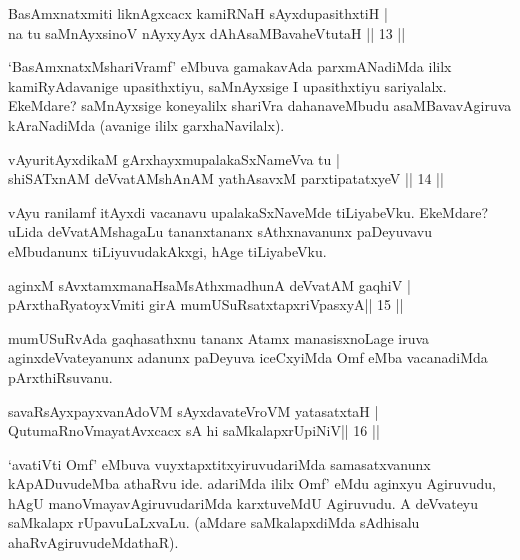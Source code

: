 \begin{shl}
BasAmxnatxmiti liknAgxcacx kamiRNaH sAyxdupasithxtiH  | \\
na tu saMnAyxsinoV nAyxyAyx dAhAsaMBavaheVtutaH \hfill||  13 || 
\end{shl}

\begin{artha} 
`BasAmxnatxMshariVramf' eMbuva gamakavAda parxmANadiMda ililx 
kamiRyAdavanige upasithxtiyu, saMnAyxsige I upasithxtiyu sariyalalx. 
EkeMdare? saMnAyxsige koneyalilx shariVra dahanaveMbudu 
asaMBavavAgiruva kAraNadiMda (avanige ililx garxhaNavilalx).
\end{artha}

\begin{shl}
vAyuritAyxdikaM gArxhayxmupalakaSxNameVva tu  | \\
shiSATxnAM deVvatAMshAnAM yathAsavxM parxtipatatxyeV \hfill||  14 || 
\end{shl}

\begin{artha} 
vAyu ranilamf itAyxdi vacanavu upalakaSxNaveMde tiLiyabeVku. EkeMdare? 
uLida deVvatAMshagaLu tananxtananx sAthxnavanunx paDeyuvavu eMbudanunx 
tiLiyuvudakAkxgi, hAge tiLiyabeVku.
\end{artha}


\begin{shl}
aginxM sAvxtamxmanaHsaMsAthxmadhunA deVvatAM gaqhiV | \\
pArxthaRyatoyxVmiti girA mumUSuRsatxtapxriVpasxyA\hfill ||  15 || 
\end{shl}

\begin{artha} 
mumUSuRvAda gaqhasathxnu tananx Atamx manasisxnoLage iruva 
aginxdeVvateyanunx adanunx paDeyuva iceCxyiMda Omf eMba vacanadiMda 
pArxthiRsuvanu.
\end{artha}


\begin{shl}
savaRsAyxpayxvanAdoVM sAyxdavateVroVM yatasatxtaH | \\
QutumaRnoVmayatAvxcacx sA hi saMkalapxrUpiNiV\hfill ||  16 || 
\end{shl}

\begin{artha} 
`avatiVti Omf' eMbuva vuyxtapxtitxyiruvudariMda samasatxvanunx 
kApADuvudeMba athaRvu ide. adariMda ililx Omf' eMdu aginxyu Agiruvudu, 
hAgU manoVmayavAgiruvudariMda karxtuveMdU Agiruvudu. A deVvateyu 
saMkalapx rUpavuLaLxvaLu. (aMdare saMkalapxdiMda sAdhisalu 
ahaRvAgiruvudeMdathaR).
\end{artha}

